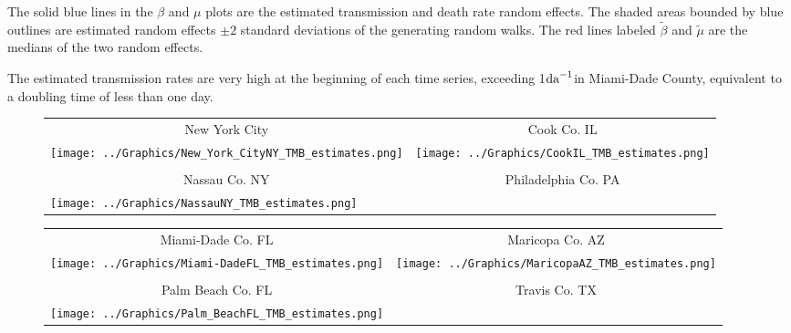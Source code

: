 \documentclass[12pt,letterpaper]{article}
\newcommand\perda{$\rm{da}^{-1}$}
\begin{document}
The solid blue lines in the $\beta$ and $\mu$ plots are the estimated
transmission and death rate random effects.
The shaded areas bounded by blue outlines are
estimated random effects $\pm 2$ standard deviations of the generating
random walks.
The red lines labeled $\tilde{\beta}$ and $\tilde{\mu}$ are the
medians of the two random effects.

The estimated transmission rates are very high
at the beginning of each time series, exceeding 1\perda in Miami-Dade
County, equivalent to a doubling time of less than one day.


\begin{figure}
{\scriptsize
\begin{center}
\begin{tabular}{ll}
\multicolumn{1}{c}{New York City}&\multicolumn{1}{c}{Cook Co. IL}\\
\texttt{[image: ../Graphics/New\_York\_CityNY\_TMB\_estimates.png]}&
\texttt{[image: ../Graphics/CookIL\_TMB\_estimates.png]}\\
\\
\multicolumn{1}{c}{Nassau Co. NY}&\multicolumn{1}{c}{Philadelphia Co.  PA}\\
\texttt{[image: ../Graphics/NassauNY\_TMB\_estimates.png]}\\
\end{tabular}
\end{center}
}
\caption{\label{fig:ests1}
}
\end{figure}

\begin{figure}
{\scriptsize
\begin{center}
\begin{tabular}{ll}
\multicolumn{1}{c}{Miami-Dade Co. FL}&\multicolumn{1}{c}{Maricopa Co. AZ}\\
\texttt{[image: ../Graphics/Miami-DadeFL\_TMB\_estimates.png]}&
\texttt{[image: ../Graphics/MaricopaAZ\_TMB\_estimates.png]}\\
\\
\multicolumn{1}{c}{Palm Beach Co. FL}&\multicolumn{1}{c}{Travis Co. TX}\\
\texttt{[image: ../Graphics/Palm\_BeachFL\_TMB\_estimates.png]}\\
\end{tabular}
\end{center}
}
\caption{\label{fig:ests2}
}
\end{figure}
\end{document}

